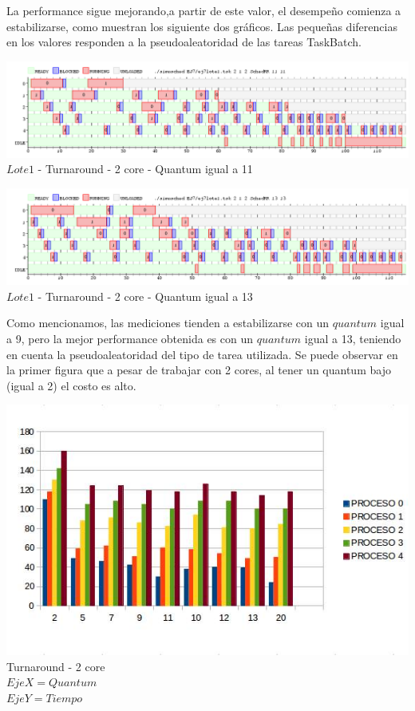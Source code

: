   
   \indent La performance sigue mejorando,a partir de este valor, el desempeño comienza a estabilizarse,  como muestran los siguiente dos gráficos. 
   Las pequeñas diferencias en los valores responden a la pseudoaleatoridad de las tareas TaskBatch.\\
  
   \begin{center}
    	\includegraphics[width=450pt]{./EJ7/ej7tour2core5quan.png}
	{$Lote 1$ - Turnaround - 2 core - Quantum igual a 11}	
 \end{center}
 

    \begin{center}
    	\includegraphics[width=450pt]{./EJ7/ej7tour2core8quan.png}
	{$Lote 1$ - Turnaround - 2 core - Quantum igual a 13}	
 \end{center}

 \indent Como mencionamos, las mediciones tienden a estabilizarse con un $quantum$ igual a 9, pero la mejor performance
 obtenida es con un $quantum$ igual a 13, teniendo en cuenta la pseudoaleatoridad del tipo de tarea utilizada.
 \indent Se puede observar en la primer figura que a pesar de trabajar con 2 cores, al tener un quantum bajo (igual a 2) 
 el costo es alto.\\
  
  
 \begin{center}
    	\includegraphics[width=1\textwidth]{./EJ7/tour2core.png}
	{Turnaround - 2 core}	\\
	{$Eje X = Quantum$\\$ Eje Y = Tiempo$}\\
 \end{center} 
 
